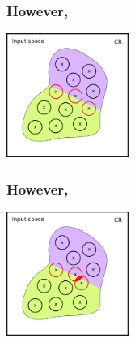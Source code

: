 \documentclass[t,compress,aspectratio=169]{beamer}
\begin{document}
\begin{frame}[fragile]
  \frametitle{However,}
  \vspace{-1em}


\begin{center}

  \includegraphics[width=4cm]{img/SR-vs-CR-4.png}

  \end{center}

\end{frame}


\begin{frame}[fragile]
  \frametitle{However,}

  \vspace{-1em}


\begin{center}

  \includegraphics[width=4cm]{img/SR-vs-CR-5.png}

  \end{center}

 \end{frame}
\end{document}
